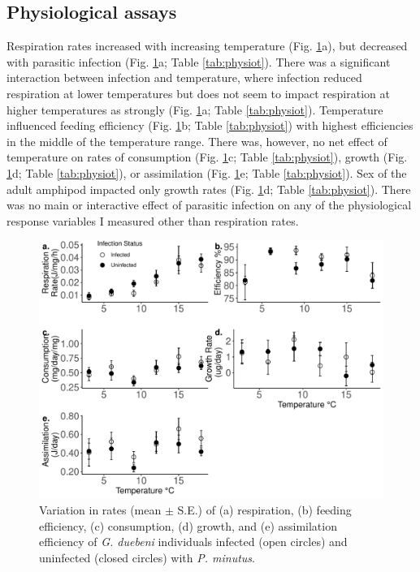 \subsection{Physiological assays}
Respiration rates increased with increasing temperature (Fig. \ref{fig:physio}a), but decreased with parasitic infection (Fig. \ref{fig:physio}a; Table \ref{tab:physiot}). There was a significant interaction between infection and temperature, where infection reduced respiration at lower temperatures but does not seem to impact respiration at higher temperatures as strongly (Fig. \ref{fig:physio}a; Table \ref{tab:physiot}). Temperature influenced feeding efficiency (Fig. \ref{fig:physio}b; Table \ref{tab:physiot}) with highest efficiencies in the middle of the temperature range. There was, however, no net effect of temperature on rates of consumption (Fig. \ref{fig:physio}c; Table \ref{tab:physiot}), growth (Fig. \ref{fig:physio}d; Table \ref{tab:physiot}), or assimilation (Fig. \ref{fig:physio}e; Table \ref{tab:physiot}). Sex of the adult amphipod impacted only growth rates (Fig. \ref{fig:physio}d; Table \ref{tab:physiot}). There was no main or interactive effect of parasitic infection on any of the physiological response variables I measured other than respiration rates. 

\begin{figure}[H]
    \centering
    \includegraphics[keepaspectratio,width=\textwidth]{figures/ch2/physio_1.pdf}
  \caption [Impact of temperature and parasites on host physiology]{Variation in rates (mean  $\pm$ S.E.) of (a) respiration, (b) feeding efficiency, (c) consumption, (d) growth, and (e) assimilation efficiency of \emph{G. duebeni} individuals infected (open circles) and uninfected (closed circles) with \emph{P. minutus}.} 
    \label{fig:physio}
\end{figure}

